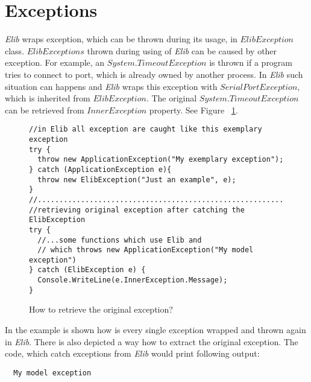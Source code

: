 \section*{Exceptions}
  {\it Elib} wraps exception, which can be thrown during its usage, in $ ElibException$ class.
  $ElibExceptions$ thrown during using of {\it Elib} can be caused by other exception.
  For example, an $System.TimeoutException$ is thrown if a program tries to connect to port, 
  which is already owned by another process.
  In {\it Elib} such situation can happens and {\it Elib} wraps this exception
  with $SerialPortException$, which is inherited from $ElibException$.
  The original $System.TimeoutException$ can be retrieved from $InnerException$ property.
  See Figure ~\ref{exceptionuse}.
\begin{figure}[!hbp]
\begin{lstlisting}
//in Elib all exception are caught like this exemplary exception
try {
  throw new ApplicationException("My exemplary exception");
} catch (ApplicationException e){
  throw new ElibException("Just an example", e);
}
//........................................................................
//retrieving original exception after catching the ElibException
try {
  //...some functions which use Elib and 
  // which throws new ApplicationException("My model exception")
} catch (ElibException e) {
  Console.WriteLine(e.InnerException.Message);
}
\end{lstlisting}
\caption{How to retrieve the original exception?}
\label{exceptionuse}
\end{figure}
  In the example is shown how is every single exception wrapped and thrown again in {\it Elib}.
  There is also depicted a way how to extract the original exception.
  The code, which catch exceptions from {\it Elib} would print following output:
\begin{verbatim}
  My model exception
\end{verbatim}


